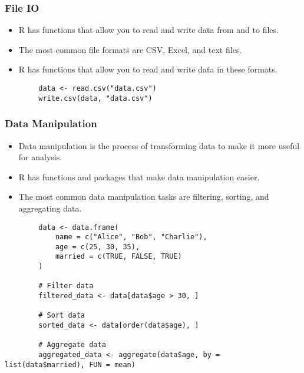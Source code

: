 \documentclass[serif, 9pt, aspectratio=32]{beamer}
\begin{document}
\begin{frame}
    \centering
    \frametitle{File IO}
    \begin{itemize}
        \setlength{\itemsep}{2em}
        \item R has functions that allow you to read and write data from and to files.
        \item The most common file formats are CSV, Excel, and text files.
        \item R has functions that allow you to read and write data in these formats.
    \end{itemize}
\end{frame}

\begin{frame}[fragile]
    \begin{lstlisting}
        data <- read.csv("data.csv")
        write.csv(data, "data.csv")
    \end{lstlisting}
\end{frame}

\begin{frame}
    \centering
    \frametitle{Data Manipulation}
    \begin{itemize}
        \setlength{\itemsep}{2em}
        \item Data manipulation is the process of transforming data to make it more useful for analysis.
        \item R has functions and packages that make data manipulation easier.
        \item The most common data manipulation tasks are filtering, sorting, and aggregating data.
    \end{itemize}
\end{frame}

\begin{frame}[fragile]
    \begin{lstlisting}
        data <- data.frame(
            name = c("Alice", "Bob", "Charlie"),
            age = c(25, 30, 35),
            married = c(TRUE, FALSE, TRUE)
        )

        # Filter data
        filtered_data <- data[data$age > 30, ]

        # Sort data
        sorted_data <- data[order(data$age), ]

        # Aggregate data
        aggregated_data <- aggregate(data$age, by = list(data$married), FUN = mean)
    \end{lstlisting}
\end{frame}
\end{document}
